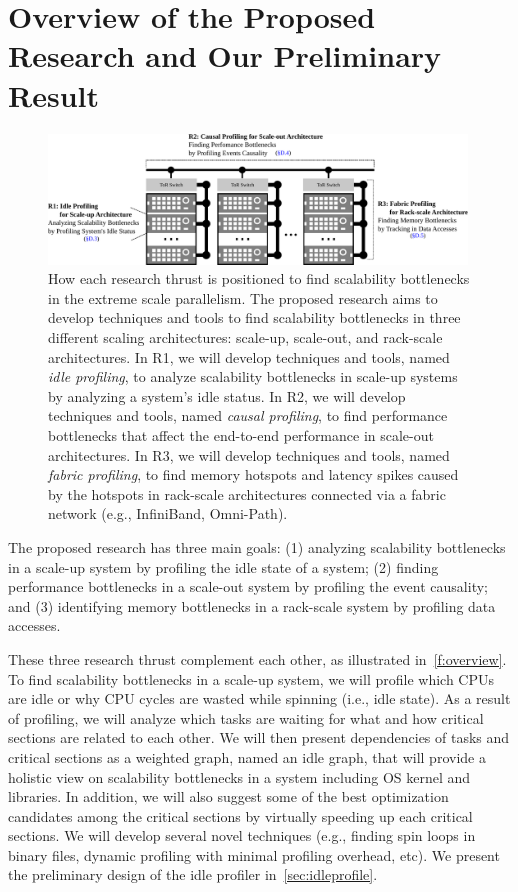 \section{Overview of the Proposed Research and Our Preliminary Result}
\label{sec:overview}

\begin{figure}[!t]
  \centering
  \includegraphics[width=0.99\textwidth]{fig/proj-overview}
  \caption{How each research thrust is positioned to find scalability
    bottlenecks in the extreme scale parallelism. The proposed
    research aims to develop techniques and tools to find scalability
    bottlenecks in three different scaling architectures: scale-up,
    scale-out, and rack-scale architectures. In R1, we will
    develop techniques and tools, named {\em idle profiling}, to
    analyze scalability bottlenecks in scale-up systems by analyzing
    a system's idle status. In R2, we will develop techniques and
    tools, named {\em causal profiling}, to find performance
    bottlenecks that affect the end-to-end performance in
    scale-out architectures. In R3, we will develop techniques
    and tools, named {\em fabric profiling}, to find memory hotspots
    and latency spikes caused by the hotspots in rack-scale
    architectures connected via a fabric network (e.g.,
    InfiniBand, Omni-Path).}
  \label{f:overview}
  \vspace{-5px}
\end{figure}

The proposed research has three main goals:
(1) analyzing scalability bottlenecks in a scale-up system by
profiling the idle state of a system;
(2) finding performance bottlenecks in a scale-out system by
profiling the event causality;
and (3) identifying memory bottlenecks in a rack-scale system by profiling
data accesses.

These three research thrust complement  each other, as
illustrated in~\autoref{f:overview}.
%
To find scalability bottlenecks in a scale-up system, we will profile which
CPUs are idle or why CPU cycles are wasted while spinning (i.e., idle state).
As a result of profiling, we will analyze which tasks are waiting for what and
how critical sections are related to each other.
We will then present dependencies of tasks and critical sections as a weighted
graph, named an idle graph, that will provide a holistic view on scalability
bottlenecks in a system including OS kernel and libraries.
In addition, we will also suggest some of the best optimization candidates among
the critical sections by virtually speeding up each critical sections.
We will develop several novel techniques (e.g., finding spin loops
in binary files, dynamic profiling with minimal profiling overhead, etc). We
present the preliminary design of the idle profiler in~\autoref{sec:idleprofile}.

